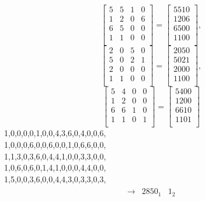 \documentclass{article}
\begin{document}
{$$
\left[
\begin{array}{*{4}{r}}
5 & 5 & 1 & 0\\
1 & 2 & 0 & 6\\
6 & 5 & 0 & 0\\
1 & 1 & 0 & 0\\
\end{array}
\right]
=
\left[
\begin{array}{c}
5510\\
1206\\
6500\\
1100\\
\end{array}
\right]
, 
$$
$$
\left[
\begin{array}{*{4}{r}}
2 & 0 & 5 & 0\\
5 & 0 & 2 & 1\\
2 & 0 & 0 & 0\\
1 & 1 & 0 & 0\\
\end{array}
\right]
=
\left[
\begin{array}{c}
2050\\
5021\\
2000\\
1100\\
\end{array}
\right]
, 
$$
$$
\left[
\begin{array}{*{4}{r}}
5 & 4 & 0 & 0\\
1 & 2 & 0 & 0\\
6 & 6 & 1 & 0\\
1 & 1 & 0 & 1\\
\end{array}
\right]
=
\left[
\begin{array}{c}
5400\\
1200\\
6610\\
1101\\
\end{array}
\right]
$$
1,0,0,0,0,1,0,0,4,3,6,0,4,0,0,6,\\
1,0,0,0,6,0,0,6,0,0,1,0,6,6,0,0,\\
1,1,3,0,3,6,0,4,4,1,0,0,3,3,0,0,\\
1,0,6,0,6,0,1,4,1,0,0,0,4,4,0,0,\\
1,5,0,0,3,6,0,0,4,4,3,0,3,3,0,3,\\
\begin{align*}
\begin{array}{r|*{2}{r}}
\rightarrow  &   2850_{  1} &      1_{  2}\\

\end{array}
\end{align*}}
\end{document}
